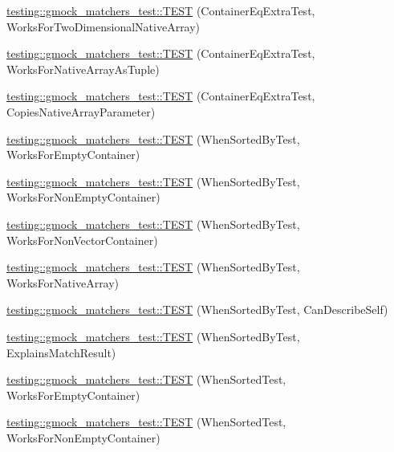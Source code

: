 \begin{DoxyCompactItemize}
\item 
\hyperlink{namespacetesting_1_1gmock__matchers__test_a3cf0d2f2c08e34ca0b7e11ff27b4a7ca}{testing\+::gmock\+\_\+matchers\+\_\+test\+::\+T\+E\+ST} (Container\+Eq\+Extra\+Test, Works\+For\+Two\+Dimensional\+Native\+Array)
\item 
\hyperlink{namespacetesting_1_1gmock__matchers__test_a94e4a2a02cde84ac51e37cda1813bc77}{testing\+::gmock\+\_\+matchers\+\_\+test\+::\+T\+E\+ST} (Container\+Eq\+Extra\+Test, Works\+For\+Native\+Array\+As\+Tuple)
\item 
\hyperlink{namespacetesting_1_1gmock__matchers__test_af7a978384d567d133240fb1899ec1658}{testing\+::gmock\+\_\+matchers\+\_\+test\+::\+T\+E\+ST} (Container\+Eq\+Extra\+Test, Copies\+Native\+Array\+Parameter)
\item 
\hyperlink{namespacetesting_1_1gmock__matchers__test_a9d88fbc6e2d01b66a1c10b192b25a802}{testing\+::gmock\+\_\+matchers\+\_\+test\+::\+T\+E\+ST} (When\+Sorted\+By\+Test, Works\+For\+Empty\+Container)
\item 
\hyperlink{namespacetesting_1_1gmock__matchers__test_a3095e5533ec12a67377dec6b0769d9a8}{testing\+::gmock\+\_\+matchers\+\_\+test\+::\+T\+E\+ST} (When\+Sorted\+By\+Test, Works\+For\+Non\+Empty\+Container)
\item 
\hyperlink{namespacetesting_1_1gmock__matchers__test_a24d3caacabfef918b7a5b9dacc5e3a66}{testing\+::gmock\+\_\+matchers\+\_\+test\+::\+T\+E\+ST} (When\+Sorted\+By\+Test, Works\+For\+Non\+Vector\+Container)
\item 
\hyperlink{namespacetesting_1_1gmock__matchers__test_a33b65fc6db83270b5c29073dbbf69c4e}{testing\+::gmock\+\_\+matchers\+\_\+test\+::\+T\+E\+ST} (When\+Sorted\+By\+Test, Works\+For\+Native\+Array)
\item 
\hyperlink{namespacetesting_1_1gmock__matchers__test_afc2d1e86837d8e3103748cb2e96b61c3}{testing\+::gmock\+\_\+matchers\+\_\+test\+::\+T\+E\+ST} (When\+Sorted\+By\+Test, Can\+Describe\+Self)
\item 
\hyperlink{namespacetesting_1_1gmock__matchers__test_ada0850ab21beccb47802aab36c06d163}{testing\+::gmock\+\_\+matchers\+\_\+test\+::\+T\+E\+ST} (When\+Sorted\+By\+Test, Explains\+Match\+Result)
\item 
\hyperlink{namespacetesting_1_1gmock__matchers__test_a76aaffd49c78fdee18f11fae5ea3f6fb}{testing\+::gmock\+\_\+matchers\+\_\+test\+::\+T\+E\+ST} (When\+Sorted\+Test, Works\+For\+Empty\+Container)
\item 
\hyperlink{namespacetesting_1_1gmock__matchers__test_a2bfbef7e777d319e3d96fc98340bb558}{testing\+::gmock\+\_\+matchers\+\_\+test\+::\+T\+E\+ST} (When\+Sorted\+Test, Works\+For\+Non\+Empty\+Container)

\end{DoxyCompactItemize}
